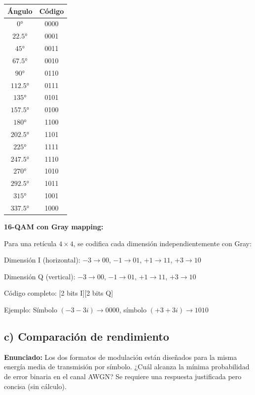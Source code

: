 \documentclass[11pt,a4paper]{article}
\begin{document}
\begin{center}
\begin{tabular}{|c|c|}
\hline
\textbf{\'Angulo} & \textbf{C\'odigo} \\
\hline
$0°$ & 0000 \\
$22.5°$ & 0001 \\
$45°$ & 0011 \\
$67.5°$ & 0010 \\
$90°$ & 0110 \\
$112.5°$ & 0111 \\
$135°$ & 0101 \\
$157.5°$ & 0100 \\
$180°$ & 1100 \\
$202.5°$ & 1101 \\
$225°$ & 1111 \\
$247.5°$ & 1110 \\
$270°$ & 1010 \\
$292.5°$ & 1011 \\
$315°$ & 1001 \\
$337.5°$ & 1000 \\
\hline
\end{tabular}
\end{center}

\textbf{16-QAM con Gray mapping:}

Para una ret\'icula $4 \times 4$, se codifica cada dimensi\'on independientemente con Gray:

Dimensi\'on I (horizontal): $-3 \rightarrow 00$, $-1 \rightarrow 01$, $+1 \rightarrow 11$, $+3 \rightarrow 10$

Dimensi\'on Q (vertical): $-3 \rightarrow 00$, $-1 \rightarrow 01$, $+1 \rightarrow 11$, $+3 \rightarrow 10$

C\'odigo completo: [2 bits I][2 bits Q]

Ejemplo: S\'imbolo $(-3-3i) \rightarrow 0000$, s\'imbolo $(+3+3i) \rightarrow 1010$



\subsection*{c) Comparaci\'on de rendimiento}

\textbf{Enunciado:} Los dos formatos de modulaci\'on est\'an dise\~nados para la misma energ\'ia media de transmisi\'on por s\'imbolo. ¿Cu\'al alcanza la m\'inima probabilidad de error binaria en el canal AWGN? Se requiere una respuesta justificada pero concisa (sin c\'alculo).
\end{document}
